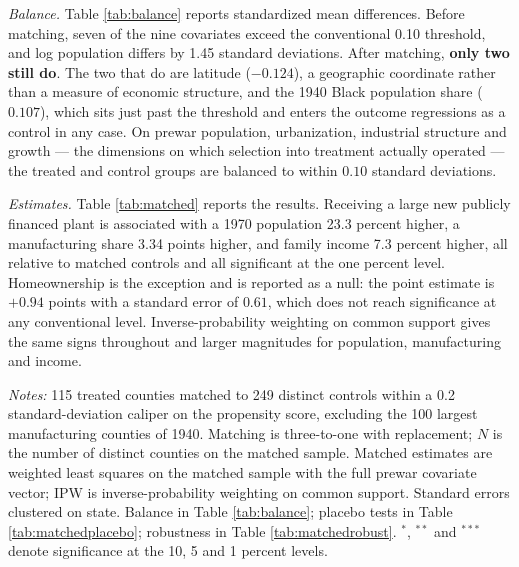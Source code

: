 \documentclass[12pt]{article}
\newcommand{\fittab}[1]{%
  \sbox{\tabbox}{#1}%
  \ifdim\wd\tabbox>\textwidth
    \resizebox{\textwidth}{!}{\usebox{\tabbox}}%
  \else\usebox{\tabbox}\fi}
\begin{document}
\emph{Balance.} Table \ref{tab:balance} reports standardized mean differences.
Before matching, seven of the nine covariates exceed the conventional
0.10 threshold, and log population differs by 1.45 standard deviations. After
matching, \textbf{only two still do}. The two that do are
latitude ($-0.124$), a geographic coordinate rather than a measure of economic
structure, and the 1940 Black population share ($0.107$), which sits just past
the threshold and enters the outcome regressions as a control in any case. On
prewar population, urbanization, industrial structure and growth --- the
dimensions on which selection into treatment actually operated --- the treated
and control groups are balanced to within $0.10$ standard deviations.

\emph{Estimates.} Table \ref{tab:matched} reports the results. Receiving a large
new publicly financed plant is associated with a 1970 population 23.3 percent
higher, a manufacturing share 3.34 points higher, and family income 7.3 percent
higher, all relative to matched controls and all significant at the one percent
level. Homeownership is the exception and is reported as a null: the point
estimate is $+0.94$ points with a standard error of $0.61$, which does not reach
significance at any conventional level. Inverse-probability weighting on common
support gives the same signs throughout and larger magnitudes for population,
manufacturing and income.

\begin{table}[htbp]
\centering
\caption{Effect of a large new publicly financed wartime plant, matched comparison}
\label{tab:matched}
\fittab{}
\vspace{2pt}
\begin{minipage}{\textwidth}\footnotesize
\textit{Notes:} 115 treated counties matched to 249 distinct controls within a
0.2 standard-deviation caliper on the propensity score, excluding the 100
largest manufacturing counties of 1940. Matching is three-to-one with
replacement; $N$ is the number of distinct counties on the matched sample. Matched estimates are weighted least squares on the matched
sample with the full prewar covariate vector; IPW is inverse-probability
weighting on common support. Standard errors clustered on state.
Balance in Table \ref{tab:balance}; placebo tests in Table
\ref{tab:matchedplacebo}; robustness in Table \ref{tab:matchedrobust}. $^{*}$, $^{**}$ and $^{***}$ denote significance at the 10, 5 and 1 percent levels.
\end{minipage}
\end{table}
\end{document}
